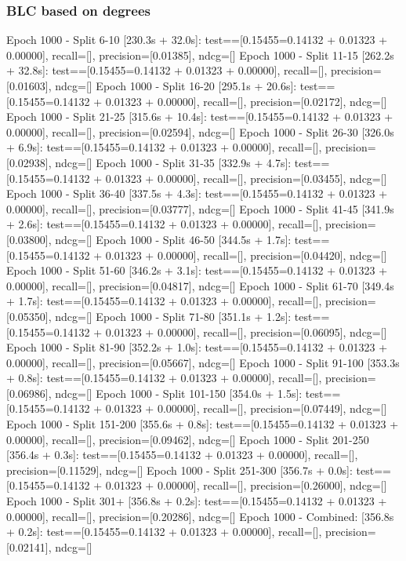 \subsubsection{BLC based on degrees}


Epoch 1000  - Split 6-10 [230.3s + 32.0s]: test==[0.15455=0.14132 + 0.01323 + 0.00000],   recall=[], precision=[0.01385], ndcg=[]
Epoch 1000  - Split 11-15 [262.2s + 32.8s]: test==[0.15455=0.14132 + 0.01323 + 0.00000],  recall=[], precision=[0.01603], ndcg=[]
Epoch 1000  - Split 16-20 [295.1s + 20.6s]: test==[0.15455=0.14132 + 0.01323 + 0.00000],  recall=[], precision=[0.02172], ndcg=[]
Epoch 1000  - Split 21-25 [315.6s + 10.4s]: test==[0.15455=0.14132 + 0.01323 + 0.00000],  recall=[], precision=[0.02594], ndcg=[]
Epoch 1000  - Split 26-30 [326.0s + 6.9s]: test==[0.15455=0.14132 + 0.01323 + 0.00000],   recall=[], precision=[0.02938], ndcg=[]
Epoch 1000  - Split 31-35 [332.9s + 4.7s]: test==[0.15455=0.14132 + 0.01323 + 0.00000],   recall=[], precision=[0.03455], ndcg=[]
Epoch 1000  - Split 36-40 [337.5s + 4.3s]: test==[0.15455=0.14132 + 0.01323 + 0.00000],   recall=[], precision=[0.03777], ndcg=[]
Epoch 1000  - Split 41-45 [341.9s + 2.6s]: test==[0.15455=0.14132 + 0.01323 + 0.00000],   recall=[], precision=[0.03800], ndcg=[]
Epoch 1000  - Split 46-50 [344.5s + 1.7s]: test==[0.15455=0.14132 + 0.01323 + 0.00000],   recall=[], precision=[0.04420], ndcg=[]
Epoch 1000  - Split 51-60 [346.2s + 3.1s]: test==[0.15455=0.14132 + 0.01323 + 0.00000],   recall=[], precision=[0.04817], ndcg=[]
Epoch 1000  - Split 61-70 [349.4s + 1.7s]: test==[0.15455=0.14132 + 0.01323 + 0.00000],   recall=[], precision=[0.05350], ndcg=[]
Epoch 1000  - Split 71-80 [351.1s + 1.2s]: test==[0.15455=0.14132 + 0.01323 + 0.00000],   recall=[], precision=[0.06095], ndcg=[]
Epoch 1000  - Split 81-90 [352.2s + 1.0s]: test==[0.15455=0.14132 + 0.01323 + 0.00000],   recall=[], precision=[0.05667], ndcg=[]
Epoch 1000  - Split 91-100 [353.3s + 0.8s]: test==[0.15455=0.14132 + 0.01323 + 0.00000],  recall=[], precision=[0.06986], ndcg=[]
Epoch 1000  - Split 101-150 [354.0s + 1.5s]: test==[0.15455=0.14132 + 0.01323 + 0.00000], recall=[], precision=[0.07449], ndcg=[]
Epoch 1000  - Split 151-200 [355.6s + 0.8s]: test==[0.15455=0.14132 + 0.01323 + 0.00000], recall=[], precision=[0.09462], ndcg=[]
Epoch 1000  - Split 201-250 [356.4s + 0.3s]: test==[0.15455=0.14132 + 0.01323 + 0.00000], recall=[], precision=[0.11529], ndcg=[]
Epoch 1000  - Split 251-300 [356.7s + 0.0s]: test==[0.15455=0.14132 + 0.01323 + 0.00000], recall=[], precision=[0.26000], ndcg=[]
Epoch 1000  - Split 301+ [356.8s + 0.2s]: test==[0.15455=0.14132 + 0.01323 + 0.00000],    recall=[], precision=[0.20286], ndcg=[]
Epoch 1000 - Combined: [356.8s + 0.2s]: test==[0.15455=0.14132 + 0.01323 + 0.00000],      recall=[], precision=[0.02141], ndcg=[]



